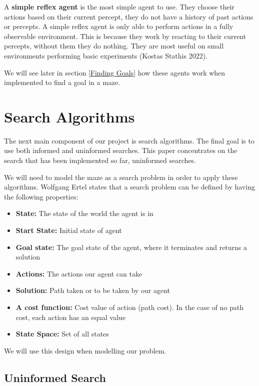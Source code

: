\documentclass[]{final_report}
\begin{document}
A \textbf{simple reflex agent} is the most simple agent to use. They choose their actions based on their current percept, they do not have a history of past actions or percepts. A simple reflex agent is only able to perform actions in a fully observable environment. This is because they work by reacting to their current percepts, without them they do nothing. They are most useful on small environments performing basic experiments (Kostas Stathis 2022).

We will see later in section \ref{Finding Goals} how these agents work when implemented to find a goal in a maze. 

\newpage
\section{Search Algorithms}\label{Search Algortithms}

The next main component of our project is search algorithms. The final goal is to use both informed and uninformed searches. This paper concentrates on the search that has been implemented so far, uninformed searches.

We will need to model the maze as a search problem in order to apply these algorithms. Wolfgang Ertel\cite{Ertel_2011} states that a search problem can be defined by having the following properties:

\begin{itemize}
    \item \textbf{State:} The state of the world the agent is in
    \item \textbf{Start State:} Initial state of agent
    \item \textbf{Goal state:} The goal state of the agent, where it terminates and returns a solution
    \item \textbf{Actions:} The actions our agent can take
    \item \textbf{Solution:} Path taken or to be taken by our agent
    \item \textbf{A cost function:} Cost value of action (path cost). In the case of no path cost, each action has an equal value
    \item \textbf{State Space:} Set of all states
\end{itemize}

We will use this design when modelling our problem.

\subsection{Uninformed Search}\label{Uninformed search} 
\end{document}
